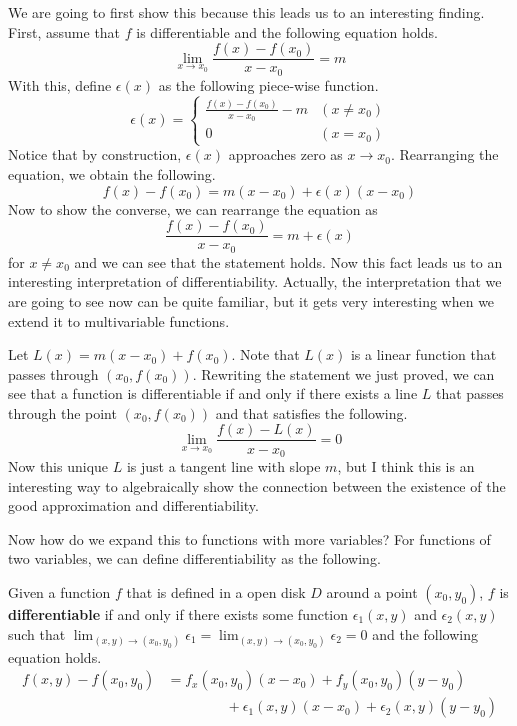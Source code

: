 \documentclass[../../../main.tex]{subfiles}
\begin{document}
We are going to first show this because this leads us to an
interesting finding. First, assume that $f$ is differentiable and
the following equation holds.
\[
\lim_{x \to x_0} \frac{f(x) - f(x_0)}{x - x_0} = m
\]
With this, define $\epsilon(x)$ as the following piece-wise function.
\[
\epsilon(x)
= \begin{cases}
    \frac{f(x) - f(x_0)}{x - x_0} - m & (x \neq x_0) \\
    0 & (x = x_0)
\end{cases}
\]
Notice that by construction, $\epsilon(x)$ approaches zero as
$x \to x_0$. Rearranging the equation, we obtain the following.
\[
f(x) - f(x_0) = m(x - x_0) + \epsilon(x) (x - x_0)
\]
Now to show the converse, we can rearrange the equation as
\[
\frac{f(x) - f(x_0)}{x - x_0} = m + \epsilon(x)
\]
for $x \neq x_0$ and we can see that the statement holds. Now this
fact leads us to an interesting interpretation of differentiability.
Actually, the interpretation that we are going to see now can be
quite familiar, but it gets very interesting when we extend it to
multivariable functions.

Let $L(x) = m(x - x_0) + f(x_0)$. Note that $L(x)$ is a linear
function that passes through $(x_0, f(x_0))$. Rewriting the
statement we just proved, we can see that a function is differentiable
if and only if there exists a line $L$ that passes through the point
$(x_0, f(x_0))$ and that satisfies the following.
\[
\lim_{x \to x_0} \frac{f(x) - L(x)}{x - x_0} = 0
\]
Now this unique $L$ is just a tangent line with slope $m$, but I think
this is an interesting way to algebraically show the connection
between the existence of the good approximation and differentiability.

Now how do we expand this to functions with more variables?
For functions of two variables, we can define differentiability as
the following.

\begin{definition}{}{}
Given a function $f$ that is defined in a open disk $D$ around a point
$(x_0, y_0)$, $f$ is \textbf{differentiable} if and only if there
exists some function $\epsilon_1(x, y)$ and $\epsilon_2(x, y)$
such that $\lim_{(x, y) \to (x_0, y_0)} \epsilon_1 = \lim_{(x, y) \to
(x_0, y_0)} \epsilon_2 = 0$ and the following equation holds.
\vspace{-0.6\baselineskip}
\begin{align*}
    f(x, y) - f(x_0, y_0)
    &= f_x(x_0, y_0) (x - x_0) + f_y(x_0, y_0) (y - y_0) \\
    &\qquad\qquad\ + \epsilon_1(x, y) (x - x_0)
        + \epsilon_2(x, y) (y - y_0)
\end{align*}
\end{definition}
\end{document}
